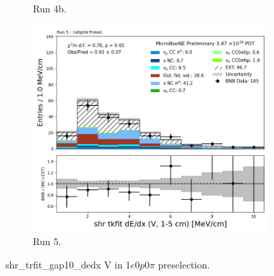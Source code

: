 \begin{figure}[H]
\begin{subfigure}[t]{0.32\linewidth}
        \caption{Run 4b.}
    \end{subfigure}%
    \hspace{0.2cm}%
    \begin{subfigure}[t]{0.32\linewidth}
        \includegraphics[width=\linewidth]{technote/Appendix_Preselection/Figures/1e0p0pi/Run5/shr_tkfit_gap10_dedx_V_Run5_1e0p0pi_Presel.png}
        \caption{Run 5.}
    \end{subfigure}
    \caption{shr\_trfit\_gap10\_dedx V in 1$e$0$p$0$\pi$ preselection.}
\end{figure}

